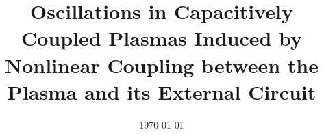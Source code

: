 \documentclass[aps,physrev,preprint,groupedaddress]{revtex4-2}
\begin{document}

\title{Oscillations in Capacitively Coupled Plasmas Induced by Nonlinear Coupling between the Plasma and its External Circuit}


\author{}
\affiliation{}


\date{\today}

\begin{abstract}
\end{abstract}


\maketitle

\section{}
\end{document}
